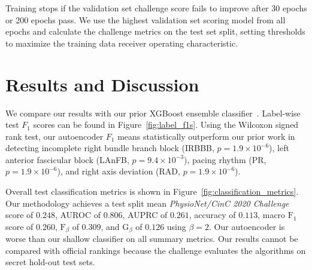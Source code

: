 \documentclass[\main/thesis.tex]{subfiles}
\begin{document}
Training stops if the validation set challenge score fails to improve after 30 epochs or 200 epochs pass.
We use the highest validation set scoring model from all epochs and calculate the challenge metrics on the test set split, setting thresholds to maximize the training data receiver operating characteristic.

\section{Results and Discussion}

We compare our results with our prior XGBoost ensemble classifier~\cite{wong2020CINC-multilabel-ECG}.
Label-wise test $F_1$ scores can be found in Figure~\ref{fig:label_f1s}.
Using the Wilcoxon signed rank test, our autoencoder $F_1$ means statistically outperform our prior work in detecting incomplete right bundle branch block (IRBBB, $p=1.9\times10^{-6}$), left anterior fascicular block (LAnFB, $p=9.4\times10^{-3}$), pacing rhythm (PR, $p=1.9\times10^{-6}$), and right axis deviation (RAD, $p=1.9\times10^{-6}$).

Overall test classification metrics is shown in Figure~\ref{fig:classification_metrics}.
Our methodology achieves a test split mean \emph{PhysioNet/CinC 2020 Challenge} score of $0.248$, AUROC of $0.806$, AUPRC of $0.261$, accuracy of $0.113$, macro $\text{F}_1$ score of $0.260$, $\text{F}_\beta$ of $0.309$, and $\text{G}_\beta$ of $0.126$ using $\beta = 2$.
Our autoencoder is worse than our shallow classifier on all summary metrics.
Our results cannot be compared with official rankings because the challenge evaluates the algorithms on secret hold-out test sets.
\end{document}
